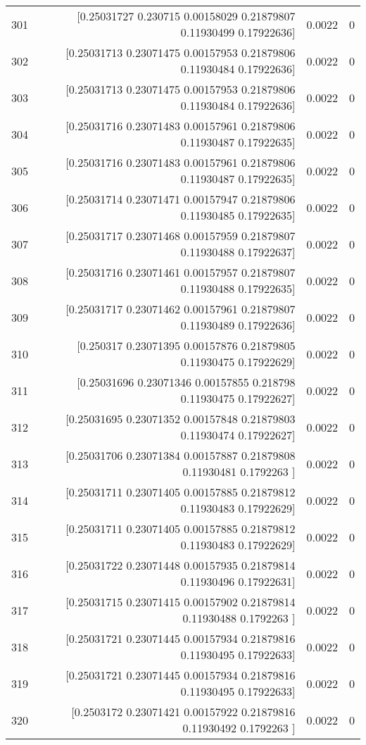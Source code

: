 \begin{longtable}{lrrr}
301 & [0.25031727 0.230715   0.00158029 0.21879807 0.11930499 0.17922636] & 0.0022 & 0 \\
302 & [0.25031713 0.23071475 0.00157953 0.21879806 0.11930484 0.17922636] & 0.0022 & 0 \\
303 & [0.25031713 0.23071475 0.00157953 0.21879806 0.11930484 0.17922636] & 0.0022 & 0 \\
304 & [0.25031716 0.23071483 0.00157961 0.21879806 0.11930487 0.17922635] & 0.0022 & 0 \\
305 & [0.25031716 0.23071483 0.00157961 0.21879806 0.11930487 0.17922635] & 0.0022 & 0 \\
306 & [0.25031714 0.23071471 0.00157947 0.21879806 0.11930485 0.17922635] & 0.0022 & 0 \\
307 & [0.25031717 0.23071468 0.00157959 0.21879807 0.11930488 0.17922637] & 0.0022 & 0 \\
308 & [0.25031716 0.23071461 0.00157957 0.21879807 0.11930488 0.17922635] & 0.0022 & 0 \\
309 & [0.25031717 0.23071462 0.00157961 0.21879807 0.11930489 0.17922636] & 0.0022 & 0 \\
310 & [0.250317   0.23071395 0.00157876 0.21879805 0.11930475 0.17922629] & 0.0022 & 0 \\
311 & [0.25031696 0.23071346 0.00157855 0.218798   0.11930475 0.17922627] & 0.0022 & 0 \\
312 & [0.25031695 0.23071352 0.00157848 0.21879803 0.11930474 0.17922627] & 0.0022 & 0 \\
313 & [0.25031706 0.23071384 0.00157887 0.21879808 0.11930481 0.1792263 ] & 0.0022 & 0 \\
314 & [0.25031711 0.23071405 0.00157885 0.21879812 0.11930483 0.17922629] & 0.0022 & 0 \\
315 & [0.25031711 0.23071405 0.00157885 0.21879812 0.11930483 0.17922629] & 0.0022 & 0 \\
316 & [0.25031722 0.23071448 0.00157935 0.21879814 0.11930496 0.17922631] & 0.0022 & 0 \\
317 & [0.25031715 0.23071415 0.00157902 0.21879814 0.11930488 0.1792263 ] & 0.0022 & 0 \\
318 & [0.25031721 0.23071445 0.00157934 0.21879816 0.11930495 0.17922633] & 0.0022 & 0 \\
319 & [0.25031721 0.23071445 0.00157934 0.21879816 0.11930495 0.17922633] & 0.0022 & 0 \\
320 & [0.2503172  0.23071421 0.00157922 0.21879816 0.11930492 0.1792263 ] & 0.0022 & 0 \\

\end{longtable}
